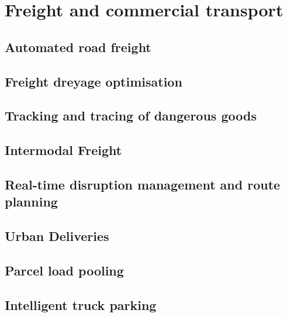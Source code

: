 \documentclass[
]{book}
\begin{document}
\hypertarget{freight}{%
\chapter{Freight and commercial transport}\label{freight}}

\hypertarget{automated_road_freight}{%
\section{Automated road freight}\label{automated_road_freight}}

\hypertarget{dreyage_optim}{%
\section{Freight dreyage optimisation}\label{dreyage_optim}}

\hypertarget{dangerous_goods}{%
\section{Tracking and tracing of dangerous goods}\label{dangerous_goods}}

\hypertarget{intermodal_freight}{%
\section{Intermodal Freight}\label{intermodal_freight}}

\hypertarget{disruption_management}{%
\section{Real-time disruption management and route planning}\label{disruption_management}}

\hypertarget{urban_delivery}{%
\section{Urban Deliveries}\label{urban_delivery}}

\hypertarget{parcel_pooling}{%
\section{Parcel load pooling}\label{parcel_pooling}}

\hypertarget{intelligent_truck_park}{%
\section{Intelligent truck parking}\label{intelligent_truck_park}}
\end{document}
